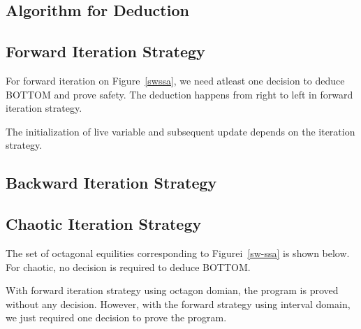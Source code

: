 \subsection{Algorithm for Deduction}

\subsection{Forward Iteration Strategy}
For forward iteration on Figure~\ref{swssa}, we need atleast 
one decision to deduce BOTTOM and prove safety. The deduction 
happens from right to left in forward iteration strategy.

The initialization of live variable and subsequent update depends on the iteration strategy.

\subsection{Backward Iteration Strategy}

\subsection{Chaotic Iteration Strategy}  
The set of octagonal equilities corresponding to Figurei~\ref{sw-ssa}
is shown below. For chaotic, no decision is required to deduce BOTTOM.


With forward iteration strategy using octagon domian, the program 
is proved without any decision. However, with the forward strategy
using interval domain, we just required one decision to prove the program. 
